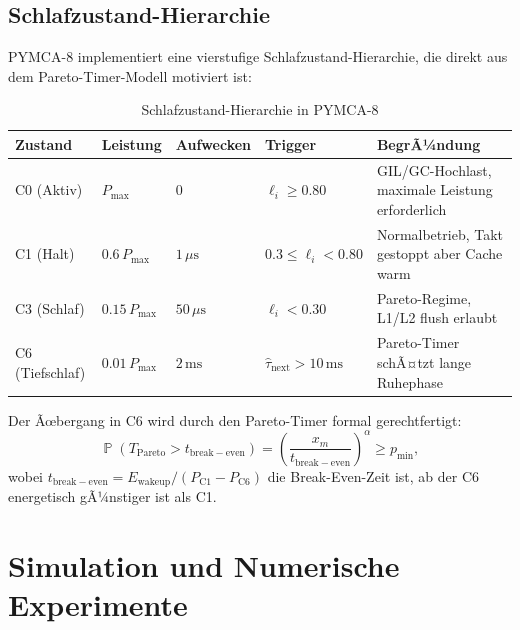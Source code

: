 ﻿\documentclass[a4paper,12pt]{scrreprt}
\theoremstyle{definition}
\DeclareMathOperator{\Prob}{\mathbb{P}}
\newcommand{\Pareto}{\mathrm{Pareto}}
\begin{document}
	\subsection{Schlafzustand-Hierarchie}
	
	PYMCA-8 implementiert eine vierstufige Schlafzustand-Hierarchie,
	die direkt aus dem Pareto-Timer-Modell motiviert ist:
	
	\begin{table}[H]
		\centering
		\caption{Schlafzustand-Hierarchie in PYMCA-8}
		\label{tab:sleep}
		\renewcommand{\arraystretch}{1.3}
		\begin{tabular}{llllp{4.5cm}}
			\toprule
			\textbf{Zustand} & \textbf{Leistung} & \textbf{Aufwecken}
			& \textbf{Trigger} & \textbf{BegrÃ¼ndung} \\
			\midrule
			C0 (Aktiv) & $P_{\max}$ & $0$ & $\ell_i \ge 0.80$ &
			GIL/GC-Hochlast, maximale Leistung erforderlich \\
			C1 (Halt) & $0.6\,P_{\max}$ & $1\,\mu\mathrm{s}$ & $0.3 \le \ell_i < 0.80$ &
			Normalbetrieb, Takt gestoppt aber Cache warm \\
			C3 (Schlaf) & $0.15\,P_{\max}$ & $50\,\mu\mathrm{s}$ & $\ell_i < 0.30$ &
			Pareto-Regime, L1/L2 flush erlaubt \\
			C6 (Tiefschlaf) & $0.01\,P_{\max}$ & $2\,\mathrm{ms}$ &
			$\hat\tau_{\mathrm{next}} > 10\,\mathrm{ms}$ &
			Pareto-Timer schÃ¤tzt lange Ruhephase \\
			\bottomrule
		\end{tabular}
	\end{table}
	
	Der Ãœbergang in C6 wird durch den Pareto-Timer formal gerechtfertigt:
	\begin{equation}
		\Prob\left(T_{\Pareto} > t_{\mathrm{break-even}}\right)
		= \left(\frac{x_m}{t_{\mathrm{break-even}}}\right)^\alpha
		\ge p_{\mathrm{min}},
		\label{eq:c6_trigger}
	\end{equation}
	wobei $t_{\mathrm{break-even}} = E_{\mathrm{wakeup}} / (P_{\mathrm{C1}} -
	P_{\mathrm{C6}})$ die Break-Even-Zeit ist, ab der C6 energetisch
	gÃ¼nstiger ist als C1.
	
	\section{Simulation und Numerische Experimente}
	
\end{document}
